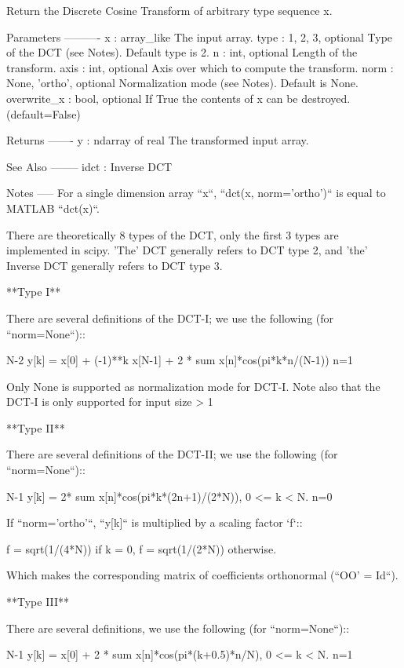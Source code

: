 \begin{DoxyVerb}Return the Discrete Cosine Transform of arbitrary type sequence x.

Parameters
----------
x : array_like
    The input array.
type : {1, 2, 3}, optional
    Type of the DCT (see Notes). Default type is 2.
n : int, optional
    Length of the transform.
axis : int, optional
    Axis over which to compute the transform.
norm : {None, 'ortho'}, optional
    Normalization mode (see Notes). Default is None.
overwrite_x : bool, optional
    If True the contents of x can be destroyed. (default=False)

Returns
-------
y : ndarray of real
    The transformed input array.

See Also
--------
idct : Inverse DCT

Notes
-----
For a single dimension array ``x``, ``dct(x, norm='ortho')`` is equal to
MATLAB ``dct(x)``.

There are theoretically 8 types of the DCT, only the first 3 types are
implemented in scipy. 'The' DCT generally refers to DCT type 2, and 'the'
Inverse DCT generally refers to DCT type 3.

**Type I**

There are several definitions of the DCT-I; we use the following
(for ``norm=None``)::

                                     N-2
  y[k] = x[0] + (-1)**k x[N-1] + 2 * sum x[n]*cos(pi*k*n/(N-1))
                                     n=1

Only None is supported as normalization mode for DCT-I. Note also that the
DCT-I is only supported for input size > 1

**Type II**

There are several definitions of the DCT-II; we use the following
(for ``norm=None``)::


            N-1
  y[k] = 2* sum x[n]*cos(pi*k*(2n+1)/(2*N)), 0 <= k < N.
            n=0

If ``norm='ortho'``, ``y[k]`` is multiplied by a scaling factor `f`::

  f = sqrt(1/(4*N)) if k = 0,
  f = sqrt(1/(2*N)) otherwise.

Which makes the corresponding matrix of coefficients orthonormal
(``OO' = Id``).

**Type III**

There are several definitions, we use the following
(for ``norm=None``)::

                    N-1
  y[k] = x[0] + 2 * sum x[n]*cos(pi*(k+0.5)*n/N), 0 <= k < N.
                    n=1


\end{DoxyVerb}
